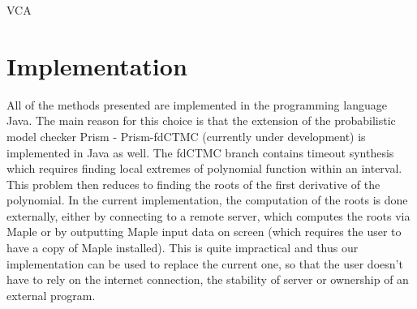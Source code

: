 \documentclass[
  digital, %
  notable,   %
  nolof,     %
  nolot,     %
	final, %
]{fithesis3}
\begin{document}
\begin{algorithm}
  \caption{VCA
    \label{alg:vca}}
  \begin{algorithmic}[1]
    \Statex
				\State\Return{$\emptyset$}
			\EndIf
				\State{}
			\EndIf
				\State{}
			\EndIf
				\State{}
			\Else
				\State{}
			\EndIf
    \EndFunction
  \end{algorithmic}
\end{algorithm}

\chapter{Implementation}
All of the methods presented are implemented in the programming language Java. The main reason for this choice is that the extension of the probabilistic model checker Prism \parencite{KNP11} - Prism-fdCTMC (currently under development) is implemented in Java as well. The fdCTMC branch contains timeout synthesis \parencite{DBLP:conf/mascots/KorenciakKR16} which requires finding local extremes of polynomial function within an interval. This problem then reduces to finding the roots of the first derivative of the polynomial. In the current implementation, the computation of the roots is done externally, either by connecting to a remote server, which computes the roots via Maple or by outputting Maple input data on screen (which requires the user to have a copy of Maple installed). This is quite impractical and thus our implementation can be used to replace the current one, so that the user doesn't have to rely on the internet connection, the stability of server or ownership of an external program.
\end{document}
